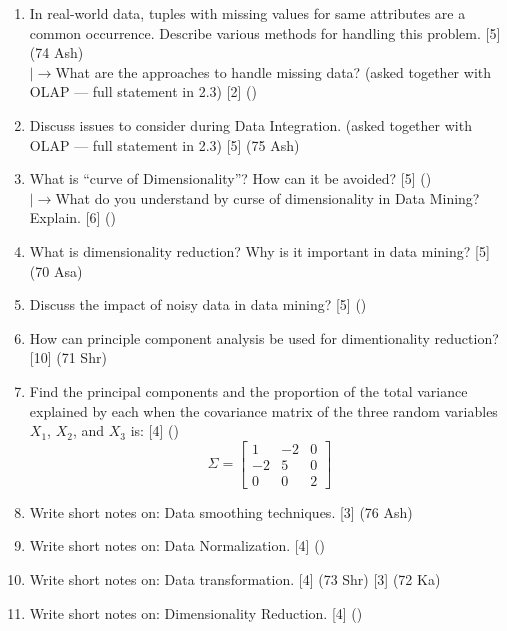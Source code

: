\documentclass[12pt]{article}
\newcommand{\lb}{\\$\left|\rightarrow\right.$}
\begin{document}
\begin{enumerate}[topsep=0pt, noitemsep]
      \item In real-world data, tuples with missing values for same attributes are a common occurrence. Describe various methods for handling this problem. \hfill [5] (74 Ash)
        \lb What are the approaches to handle missing data? (asked together with OLAP --- full statement in 2.3) \hfill [2] ()

      \item Discuss issues to consider during Data Integration. (asked together with OLAP --- full statement in 2.3) \hfill [5] (75 Ash)

      \item What is ``curve of Dimensionality''? How can it be avoided? \hfill [5] ()
        \lb What do you understand by curse of dimensionality in Data Mining? Explain. \hfill [6] ()

      \item What is dimensionality reduction? Why is it important in data mining? \hfill [5] (70 Asa)

      \item Discuss the impact of noisy data in data mining? \hfill [5] ()

      \item How can principle component analysis be used for dimentionality reduction? \hfill [10] (71 Shr)

      \item Find the principal components and the proportion of the total variance explained by each when the covariance matrix of the three random variables $X_1$, $X_2$, and $X_3$ is: \hfill [4] ()
        \[ \Sigma = \begin{bmatrix} 1 & -2 & 0 \\ -2 & 5 & 0 \\ 0 & 0 & 2 \end{bmatrix} \]

      \item Write short notes on: Data smoothing techniques. \hfill [3] (76 Ash)

      \item Write short notes on: Data Normalization. \hfill [4] ()

      \item Write short notes on: Data transformation. \hfill [4] (73 Shr) [3] (72 Ka)

      \item Write short notes on: Dimensionality Reduction. \hfill [4] ()
    \end{enumerate}
\end{document}
